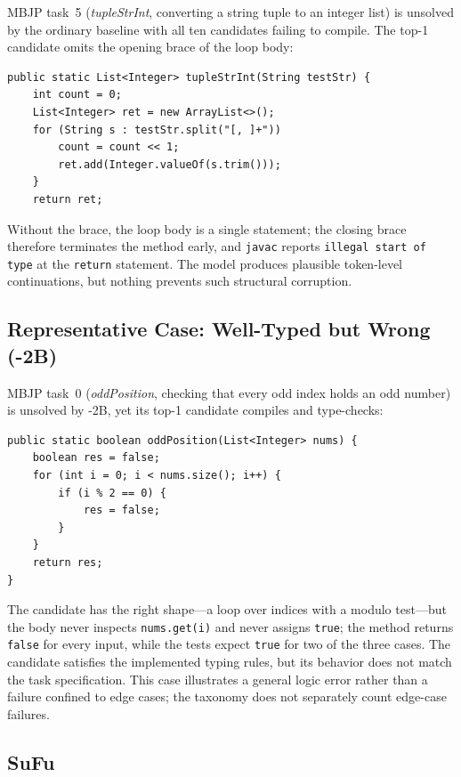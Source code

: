 MBJP task~5 (\emph{tupleStrInt}, converting a string tuple to an integer list) is unsolved by the ordinary baseline with all ten candidates failing to compile.
The top-1 candidate omits the opening brace of the loop body:
\begin{tcolorbox}
\begin{Verbatim}[fontsize=\small]
public static List<Integer> tupleStrInt(String testStr) {
    int count = 0;
    List<Integer> ret = new ArrayList<>();
    for (String s : testStr.split("[, ]+"))
        count = count << 1;
        ret.add(Integer.valueOf(s.trim()));
    }
    return ret;
\end{Verbatim}
\end{tcolorbox}
Without the brace, the loop body is a single statement; the closing brace therefore terminates the method early, and \texttt{javac} reports \texttt{illegal start of type} at the \texttt{return} statement.
The model produces plausible token-level continuations, but nothing prevents such structural corruption.

\subsection{Representative Case: Well-Typed but Wrong (\mainname-2B)}

MBJP task~0 (\emph{oddPosition}, checking that every odd index holds an odd number) is unsolved by \mainname-2B, yet its top-1 candidate compiles and type-checks:
\begin{tcolorbox}
\begin{Verbatim}[fontsize=\small]
public static boolean oddPosition(List<Integer> nums) {
    boolean res = false;
    for (int i = 0; i < nums.size(); i++) {
        if (i % 2 == 0) {
            res = false;
        }
    }
    return res;
}
\end{Verbatim}
\end{tcolorbox}
The candidate has the right shape---a loop over indices with a modulo test---but the body never inspects \texttt{nums.get(i)} and never assigns \texttt{true}; the method returns \texttt{false} for every input, while the tests expect \texttt{true} for two of the three cases.
The candidate satisfies the implemented typing rules, but its behavior does not match the task specification. This case illustrates a general logic error rather than a failure confined to edge cases; the taxonomy does not separately count edge-case failures.

\subsection{SuFu}

